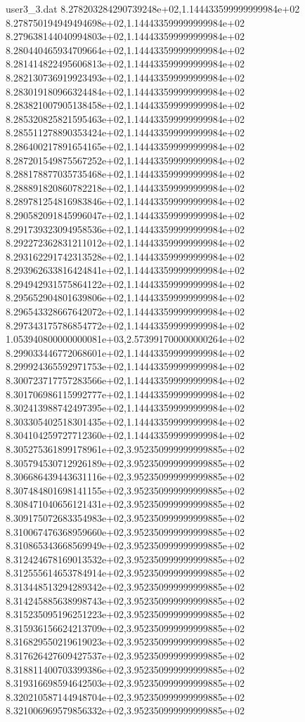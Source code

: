 \begin{filecontents}{user3_3.dat}
8.278203284290739248e+02,1.144433599999999984e+02
8.278750194949494698e+02,1.144433599999999984e+02
8.279638144040994803e+02,1.144433599999999984e+02
8.280440465934709664e+02,1.144433599999999984e+02
8.281414822495606813e+02,1.144433599999999984e+02
8.282130736919923493e+02,1.144433599999999984e+02
8.283019180966324484e+02,1.144433599999999984e+02
8.283821007905138458e+02,1.144433599999999984e+02
8.285320825821595463e+02,1.144433599999999984e+02
8.285511278890353424e+02,1.144433599999999984e+02
8.286400217891654165e+02,1.144433599999999984e+02
8.287201549875567252e+02,1.144433599999999984e+02
8.288178877035735468e+02,1.144433599999999984e+02
8.288891820860782218e+02,1.144433599999999984e+02
8.289781254816983846e+02,1.144433599999999984e+02
8.290582091845996047e+02,1.144433599999999984e+02
8.291739323094958536e+02,1.144433599999999984e+02
8.292272362831211012e+02,1.144433599999999984e+02
8.293162291742313528e+02,1.144433599999999984e+02
8.293962633816424841e+02,1.144433599999999984e+02
8.294942931575864122e+02,1.144433599999999984e+02
8.295652904801639806e+02,1.144433599999999984e+02
8.296543328667642072e+02,1.144433599999999984e+02
8.297343175786854772e+02,1.144433599999999984e+02
1.053940800000000081e+03,2.573991700000000264e+02
8.299033446772068601e+02,1.144433599999999984e+02
8.299924365592971753e+02,1.144433599999999984e+02
8.300723717757283566e+02,1.144433599999999984e+02
8.301706986115992777e+02,1.144433599999999984e+02
8.302413988742497395e+02,1.144433599999999984e+02
8.303305402518301435e+02,1.144433599999999984e+02
8.304104259727712360e+02,1.144433599999999984e+02
8.305275361899178961e+02,3.952350999999999885e+02
8.305794530712926189e+02,3.952350999999999885e+02
8.306686439443631116e+02,3.952350999999999885e+02
8.307484801698141155e+02,3.952350999999999885e+02
8.308471040656121431e+02,3.952350999999999885e+02
8.309175072683354983e+02,3.952350999999999885e+02
8.310067476368959660e+02,3.952350999999999885e+02
8.310865343668569949e+02,3.952350999999999885e+02
8.312424678169013532e+02,3.952350999999999885e+02
8.312555614653784914e+02,3.952350999999999885e+02
8.313448513294289342e+02,3.952350999999999885e+02
8.314245885638998743e+02,3.952350999999999885e+02
8.315235095196251223e+02,3.952350999999999885e+02
8.315936156624213709e+02,3.952350999999999885e+02
8.316829550219619023e+02,3.952350999999999885e+02
8.317626427609427537e+02,3.952350999999999885e+02
8.318811400703399386e+02,3.952350999999999885e+02
8.319316698594642503e+02,3.952350999999999885e+02
8.320210587144948704e+02,3.952350999999999885e+02
8.321006969579856332e+02,3.952350999999999885e+02

\end{filecontents}

